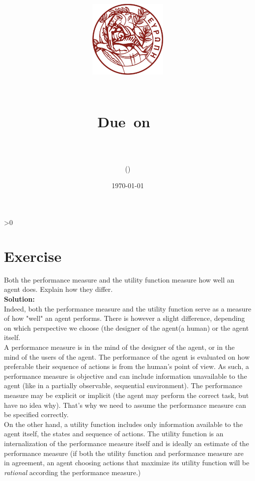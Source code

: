 \documentclass{article}
\title{
	\centering
	\includegraphics[height=1.5in]{images/background.png}
	
	 \vspace{1in}
	\textmd{\textbf{\hmwkClass\ \hmwkTitle}}\\
	
	\normalsize\vspace{0.1in}\small{Due\ on\ \hmwkDueDate}\\
	
	\vspace{0.1in}\large{\textit{\hmwkClassInstructor}} \\
	\vspace{0.5in}
	\large{\hmwkUniversity}

	\vspace{3in}
	
	\author{\textbf{\hmwkAuthorName} (\hmwkAuthorID)}
	\date{\today}
}
\newcounter{partCounter}
\newcounter{ExerciseCounter}
\newenvironment{Exercise}[1][-1]{
	\ifnum#1>0
	\setcounter{ExerciseCounter}{#1}
	\fi
	\section{Exercise \arabic{ExerciseCounter}}
	\setcounter{partCounter}{1}
}{
}
\newcommand{\solution}{\textbf{\large Solution:}}
\begin{document}
	\maketitle
	
	
	
	\begin{Exercise}[1]
		Both the performance measure and the utility function measure how well an agent does. Explain how they differ. \\
		
		\solution \\
				
		Indeed, both the performance measure and the utility function serve as a measure of how "well" an agent performs. There is however a slight difference, depending on which perspective we choose (the designer of the agent(a human) or the agent itself. \\
		
		A performance measure is in the mind of the designer of the agent, or in the mind of the users of the agent. The performance of the agent is evaluated on how preferable their sequence of actions is from the human's point of view. As such, a performance measure is objective and can include information unavailable to the agent (like in a partially observable, sequential environment). The performance measure may be explicit or implicit (the agent may perform the correct task, but have no idea why). That's why we need to assume the performance measure can be specified correctly. \\
		
		On the other hand, a utility function includes only information available to the agent itself, the states and sequence of actions. The utility function is an internalization of the performance measure itself and is ideally an estimate of the performance measure (if both the utility function and performance measure are in agreement, an agent choosing actions that maximize its utility function will be \textit{rational} according the performance measure.)
		
	\end{Exercise}
	
	\newpage
	
\end{document}
